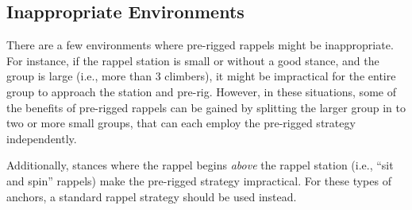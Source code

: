\documentclass[nonacm,acmtog]{acmart}
\begin{document}
\subsection{Inappropriate Environments}

   There are a few environments where pre-rigged rappels might be
   inappropriate.  For instance, if the rappel station is small or without a
   good stance, and the group is large (i.e., more than 3 climbers), it might
   be impractical for the entire group to approach the station and pre-rig.
   However, in these situations, some of the benefits of pre-rigged rappels can
   be gained by splitting the larger group in to two or more small groups, that
   can each employ the pre-rigged strategy independently.

   Additionally, stances where the rappel begins {\em above} the rappel station
   (i.e., ``sit and spin'' rappels) make the pre-rigged strategy impractical.
   For these types of anchors, a standard rappel strategy should be used
   instead.

\begin{comment}
\section{Pre-Rigged Rappels and the Mountaineers}
\label{sec:mountaineers}

  The Mountaineers' climbing classes teach pre-rigged rappels as follows:

  \begin{table}
  \begin{tabular}{|rll|}
    \hline
    \textbf{Branch} & \textbf{Class} & \textbf{Taught?} \\
    \hline\hline
    Everett    & Basic & No \\
               & Intermediate (LOR) & Considering \\
    \hline
    Bellingham & Basic & Demonstrated \\
               & Intermediate & Yes \\
    \hline
    Kitsap & --- & No \\
    \hline
    Olympia & --- & No \\
    \hline
    Seattle & Basic & No \\
            & Intermediate (rock, ice) & No \\
            & Advanced Alpine Rock     & Yes \\
    \hline
    Tacoma  & --  & No \\
    \hline
  \end{tabular}
  \caption{Current curriculum status of pre-rigged rappels in various courses
  at the Mountaineers branches}
  \end{table}
\end{comment}
\end{document}
